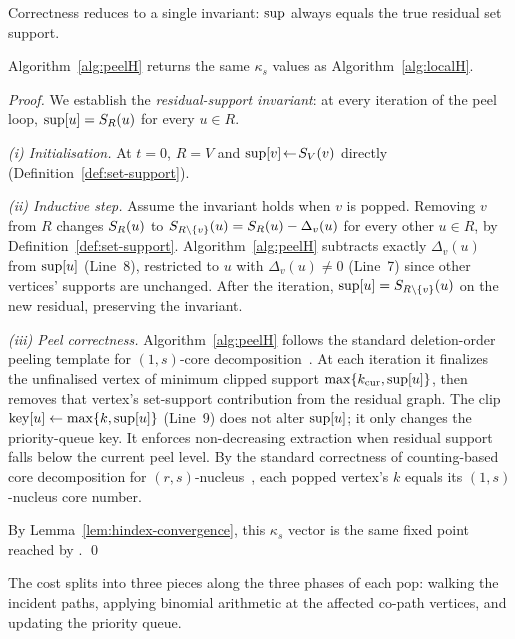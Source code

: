 Correctness reduces to a single invariant: $\mathrm{sup}$ always equals the true residual set support.

\begin{lemma}\label{lem:equivalence}
Algorithm~\ref{alg:peelH} returns the same $\kappa_s$ values as Algorithm~\ref{alg:localH}.
\end{lemma}

\begin{proof}
We establish the \emph{residual-support invariant}: at every iteration of the peel loop, $\mathrm{sup}[u]=S_R(u)$ for every $u\in R$.

\smallskip
\noindent\emph{(i) Initialisation.}
At $t=0$, $R=V$ and $\mathrm{sup}[v]\!\gets\!S_V(v)$ directly (Definition~\ref{def:set-support}).

\smallskip
\noindent\emph{(ii) Inductive step.}
Assume the invariant holds when $v$ is popped.
%
Removing $v$ from $R$ changes $S_R(u)$ to $S_{R\setminus\{v\}}(u)=S_R(u)-\Delta_v(u)$ for every other $u\in R$, by Definition~\ref{def:set-support}.
%
Algorithm~\ref{alg:peelH} subtracts exactly $\Delta_v(u)$ from $\mathrm{sup}[u]$ (Line~8), restricted to $u$ with $\Delta_v(u)\!\ne\!0$ (Line~7) since other vertices' supports are unchanged.
%
After the iteration, $\mathrm{sup}[u]=S_{R\setminus\{v\}}(u)$ on the new residual, preserving the invariant.

\smallskip
\noindent\emph{(iii) Peel correctness.}
Algorithm~\ref{alg:peelH} follows the standard deletion-order peeling template for $(1,s)$-core decomposition~\cite{coreAlg,nucleusSariyuce14}.
%
At each iteration it finalizes the unfinalised vertex of minimum clipped support $\max\{k_{\mathrm{cur}},\mathrm{sup}[u]\}$, then removes that vertex's set-support contribution from the residual graph.
%
The clip $\mathrm{key}[u]\gets\max\{k,\mathrm{sup}[u]\}$ (Line~9) does not alter $\mathrm{sup}[u]$; it only changes the priority-queue key.
%
It enforces non-decreasing extraction when residual support falls below the current peel level.
%
By the standard correctness of counting-based core decomposition for $(r,s)$-nucleus~\cite{nucleusSariyuce14}, each popped vertex's $k$ equals its $(1,s)$-nucleus core number.

\smallskip
By Lemma~\ref{lem:hindex-convergence}, this $\kappa_s$ vector is the same fixed point reached by \spin{}.
%
\qed
\end{proof}

The cost splits into three pieces along the three phases of each pop: walking the incident paths, applying binomial arithmetic at the affected co-path vertices, and updating the priority queue.

